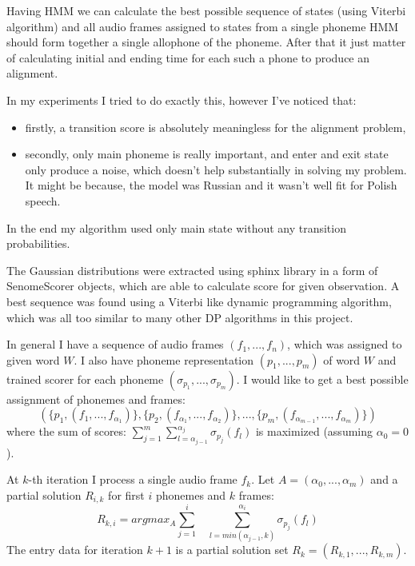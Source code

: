 \documentclass[12pt,a4paper,english]{article}
\begin{document}
Having HMM we can calculate the best possible sequence of states (using Viterbi algorithm) and all audio frames assigned to states from a single phoneme HMM should form together a single allophone of the phoneme. After that it just matter of calculating initial and ending time for each such a phone to produce an alignment. \newline

In my experiments I tried to do exactly this, however I've noticed that:
\begin{itemize}
    \item firstly, a transition score is absolutely meaningless for the alignment problem,
    \item secondly, only main phoneme is really important, and enter and exit state only produce a noise, which doesn't help substantially in solving my problem. It might be because, the model was Russian and it wasn't well fit for Polish speech.
\end{itemize}
In the end my algorithm used only main state without any transition probabilities. \newline

\newpage
The Gaussian distributions were extracted using sphinx library in a form of SenomeScorer objects, which are able to calculate score for given observation. A best sequence was found using a Viterbi like dynamic programming algorithm, which was all too similar to many other DP algorithms in this project. \newline

In general I have a sequence of audio frames $(f_1, ..., f_n)$, which was assigned to given word $W$. \newline
I also have phoneme representation $(p_1, ..., p_m)$ of word $W$ and trained scorer for each phoneme $(\sigma_{p_1}, ..., \sigma_{p_m})$. \newline
I would like to get a best possible assignment of phonemes and frames:
\begin{equation}
    (\{p_1, (f_1,...,f_{\alpha_1})\}, \{p_2, (f_{\alpha_1},...,f_{\alpha_2})\}, ..., \{p_m, (f_{\alpha_{m-1}},...,f_{\alpha_m})\})
\end{equation}
where the sum of scores: $\sum_{j=1}^m \sum_{l=\alpha_{j-1}}^{\alpha_j} \sigma_{p_j}(f_l)$ is maximized (assuming $\alpha_0 = 0$). \newline

At $k$-th iteration I process a single audio frame $f_k$.\newline
Let $A = (\alpha_0, ..., \alpha_m)$ and a  partial solution $R_{i, k}$ for first $i$ phonemes and $k$ frames:
\begin{equation}
    R_{k, i} = argmax_A \sum_{j=1}^i \: \: \: \: \sum_{l=min(\alpha_{j-1}, k)}^{\alpha_i} \sigma_{p_j}(f_l)
\end{equation}
The entry data for iteration $k+1$ is a partial solution set $R_k = (R_{k, 1}, ..., R_{k, m})$. \newline
\end{document}
